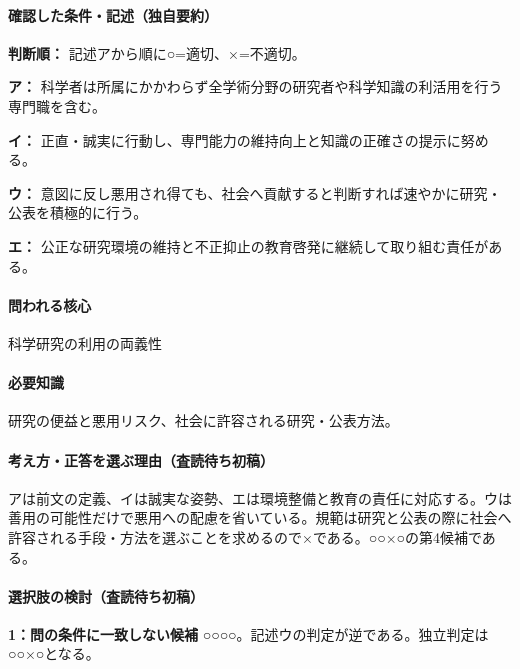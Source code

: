 \paragraph{確認した条件・記述（独自要約）}\mbox{}\par

\noindent\textbf{判断順：} 記述アから順に○=適切、×=不適切。\par

\noindent\textbf{ア：} 科学者は所属にかかわらず全学術分野の研究者や科学知識の利活用を行う専門職を含む。\par

\noindent\textbf{イ：} 正直・誠実に行動し、専門能力の維持向上と知識の正確さの提示に努める。\par

\noindent\textbf{ウ：} 意図に反し悪用され得ても、社会へ貢献すると判断すれば速やかに研究・公表を積極的に行う。\par

\noindent\textbf{エ：} 公正な研究環境の維持と不正抑止の教育啓発に継続して取り組む責任がある。\par

\paragraph{問われる核心} 科学研究の利用の両義性

\paragraph{必要知識} 研究の便益と悪用リスク、社会に許容される研究・公表方法。

\paragraph{考え方・正答を選ぶ理由（査読待ち初稿）} アは前文の定義、イは誠実な姿勢、エは環境整備と教育の責任に対応する。ウは善用の可能性だけで悪用への配慮を省いている。規範は研究と公表の際に社会へ許容される手段・方法を選ぶことを求めるので×である。○○×○の第4候補である。

\paragraph{選択肢の検討（査読待ち初稿）}\mbox{}\par

\noindent\textbf{1：問の条件に一致しない候補} ○○○○。記述ウの判定が逆である。独立判定は○○×○となる。\par

